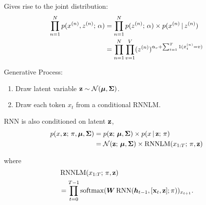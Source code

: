 \begin{frame}

\begin{center}

\end{center}

\air
\air

Gives rise to the joint distribution:
\begin{align*}
     \prod_{n=1}^N p(x^{(n)}, z^{(n)} ; \, \alpha) &= \prod_{n=1}^N p(z^{(n)} ; \, \alpha) \times p(x^{(n)} \,|\, z^{(n)} ) \\
     &= \prod_{n=1}^N \prod_{v=1}^V  (z^{(n)})^{\alpha_v + \sum_{t=1}^T  1(x^{(n)}_t = v)}  \\
     \end{align*}
\end{frame}


\begin{frame}
Generative Process:

\begin{enumerate}
    \item Draw latent variable $\mathbf{z} \sim \mathcal{N}(\boldsymbol{\mu}, \boldsymbol{\Sigma})$.
    \item Draw each token $x_t$ from a conditional RNNLM. 
\end{enumerate}


RNN is also conditioned on latent $\mathbf{z}$,  
\begin{align*}
     p(x, \mathbf{z} ; \, \pi, \boldsymbol{\mu}, \boldsymbol{\Sigma})  &= p(\mathbf{z} ; \, \boldsymbol{\mu}, \boldsymbol{\Sigma}) \times p(x \,|\, \mathbf{z} ; \, \pi) \\ 
      &  = \mathcal{N}(\mathbf{z} ; \, \boldsymbol{\mu}, \boldsymbol{\Sigma})  \times \operatorname*{RNNLM}(x_{1:T}  ; \, \pi,  \mathbf{z})
\end{align*}

where 
\begin{align*} 
&\operatorname*{RNNLM}(x_{1:T}  ; \, \pi, \mathbf{z}) \\
&= \prod_{t=0}^{T-1} \operatorname*{softmax}(\boldsymbol{W} \operatorname*{RNN}(\boldsymbol{h}_{t-1}, [\mathbf{x}_t, \mathbf{z}]; \pi))_{x_{t+1}}.
\end{align*}

\end{frame}

